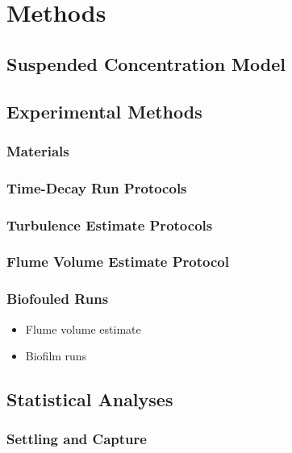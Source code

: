 \documentclass{article}
\begin{document}
\section{Methods}

\subsection{Suspended Concentration Model}

\subsection{Experimental Methods}

\subsubsection{Materials}

\subsubsection{Time-Decay Run Protocols}

\subsubsection{Turbulence Estimate Protocols}

\subsubsection{Flume Volume Estimate Protocol}

\subsubsection{Biofouled Runs}

\begin{itemize}
    \item Flume volume estimate
    \item Biofilm runs
\end{itemize}

\subsection{Statistical Analyses}

\subsubsection{Settling and Capture}
\end{document}
